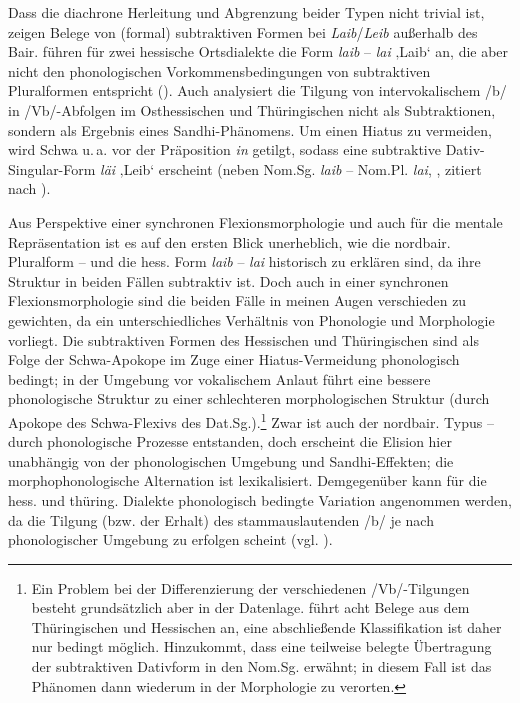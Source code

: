 Dass die diachrone Herleitung und Abgrenzung beider Typen nicht trivial ist, zeigen Belege von (formal) subtraktiven Formen bei \textit{Laib}/\textit{Leib} außerhalb des Bair. \citet[158, FN 6]{GolstonWiese1996} führen für zwei hessische Ortsdialekte die Form \textit{laib} -- \textit{lai} ‚Laib‘ an, die aber nicht den phonologischen Vorkommensbedingungen von subtraktiven Pluralformen entspricht
(\citealt[147]{GolstonWiese1996}). Auch \citet[93--94]{Birkenes2014} analysiert die Tilgung von intervokalischem /b/ in /Vb/-Abfolgen im Osthessischen und Thüringischen nicht als Subtraktionen, sondern als Ergebnis eines Sandhi-Phänomens. Um einen Hiatus zu vermeiden, wird Schwa u.\,a. vor der Präposition \textit{in} getilgt, sodass eine subtraktive Dativ-Singular-Form \textit{läi} ‚Leib‘ erscheint (neben Nom.Sg. \textit{laib} -- Nom.Pl. \textit{lai}, \citealt[350]{Alles1907/1908}, zitiert nach \citealt[94]{Birkenes2014}).

Aus Perspektive einer synchronen Flexionsmorphologie und auch für die mentale Repräsentation ist es auf den ersten Blick unerheblich, wie die nordbair. Pluralform  --  und die hess. Form \textit{laib} -- \textit{lai} historisch zu erklären sind, da ihre Struktur in beiden Fällen subtraktiv ist. Doch auch in einer synchronen Flexionsmorphologie sind die beiden Fälle in meinen Augen verschieden zu gewichten, da ein unterschiedliches Verhältnis von Phonologie und Morphologie vorliegt. Die subtraktiven Formen des Hessischen und Thüringischen sind als Folge der Schwa-Apokope im Zuge einer Hiatus-Vermeidung phonologisch bedingt; in der Umgebung vor vokalischem Anlaut führt eine bessere phonologische Struktur zu einer schlechteren morphologischen Struktur (durch Apokope des Schwa-Flexivs des Dat.Sg.).\footnote{Ein Problem bei der Differenzierung der verschiedenen /Vb/-Tilgungen besteht grundsätzlich aber in der Datenlage. \citet[94]{Birkenes2014} führt acht Belege aus dem Thüringischen und Hessischen an, eine abschließende Klassifikation ist daher nur bedingt möglich. Hinzukommt, dass \citet[234]{Alles1907/1908} eine teilweise belegte Übertragung der subtraktiven Dativform in den Nom.Sg. erwähnt; in diesem Fall ist das Phänomen dann wiederum in der Morphologie zu verorten.} Zwar ist auch der nordbair. Typus  --  durch phonologische Prozesse entstanden, doch erscheint die Elision hier unabhängig von der phonologischen Umgebung und Sandhi-Effekten; die morphophonologische Alternation ist lexikalisiert. Demgegenüber kann für die hess. und thüring. Dialekte phonologisch bedingte Variation angenommen werden, da die Tilgung (bzw. der Erhalt) des stammauslautenden /b/ je nach phonologischer Umgebung zu erfolgen scheint (vgl. \citealt[94]{Birkenes2014}).

